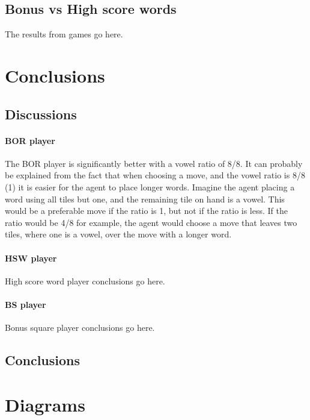 \documentclass[a4paper, 12pt]{report}
\begin{document}
\section{Bonus vs High score words}
\label{sec:bonusHigh}
The results from games go here.




\chapter{Conclusions}
\section{Discussions}
\subsubsection{BOR player}
The BOR player is significantly better with a vowel ratio of 8/8. It can probably be explained from the fact that when choosing a move, and the vowel ratio is 8/8 (1) it is easier for the agent to place longer words. Imagine the agent placing a word using all tiles but one, and the remaining tile on hand is a vowel. This would be a preferable move if the ratio is 1, but not if the ratio is less. If the ratio would be 4/8 for example, the agent would choose a move that leaves two tiles, where one is a vowel, over the move with a longer word. 

\subsubsection{HSW player}
High score word player conclusions go here.

\subsubsection{BS player}
Bonus square player conclusions go here.

\section{Conclusions}


\appendix
\chapter{Diagrams}
\end{document}
